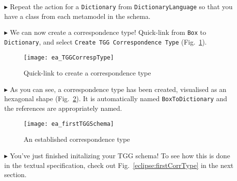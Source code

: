 \begin{itemize}
\item[$\blacktriangleright$] Repeat the action for a \texttt{Dictionary} from \texttt{DictionaryLanguage} so that you have a class from each metamodel in the
schema.

\vspace{0.5cm}

\item[$\blacktriangleright$] We can now create a correspondence type! Quick-link from \texttt{Box} to \texttt{Dictionary}, and select \texttt{Create TGG
Corres\-pon\-dence Type} (Fig.~\ref{ea:create_correspondence}).

\newpage

\begin{figure}[htbp]
\begin{center}
  \texttt{[image: ea\_TGGCorrespType]}
  \caption{Quick-link to create a correspondence type} 
  \label{ea:create_correspondence}
\end{center}
\end{figure}

\item[$\blacktriangleright$] As you can see, a correspondence type has been created, visualised as an hexagonal shape (Fig.~\ref{ea:firstCorrType}). It is
automatically named \texttt{BoxToDiction\-ary} and the references are appropriately named.

\vspace{0.5cm}

\begin{figure}[htbp]
\begin{center}
  \texttt{[image: ea\_firstTGGSchema]}
  \caption{An established correspondence type} 
  \label{ea:firstCorrType}
\end{center}
\end{figure}

\vspace{0.5cm}

\item[$\blacktriangleright$] You've just finished initalizing your TGG schema! To see how this is done in the textual specification, check out
Fig.~\ref{eclipse:firstCorrType} in the next section.




\end{itemize}

